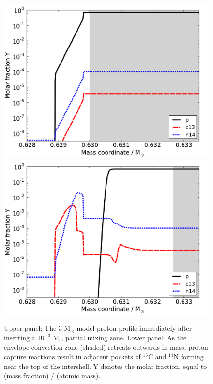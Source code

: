 \begin{figure}
 \begin{center}\includegraphics[height=0.40\textheight]{figures/m3z01-ths8pmz1-0006940}
 \includegraphics[height=0.40\textheight]{figures/m3z01-ths8pmz1-0007184}\end{center}
 \caption{Upper panel: The 3 M$_\odot$ model proton profile immediately after inserting a $10^{-3}$ M$_\odot$ partial mixing zone. Lower panel: As the envelope convection zone (shaded) retreats outwards in mass, proton capture reactions result in adjacent pockets of $^{13}$C and $^{14}$N forming near the top of the intershell. Y denotes the molar fraction, equal to (mass fraction) / (atomic mass).}\label{fig:c13n14pockets}
\end{figure}

